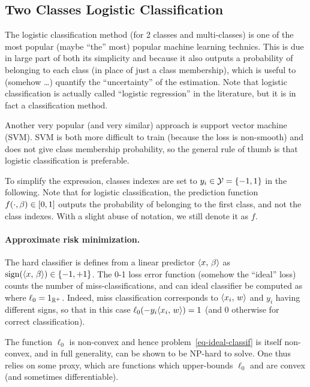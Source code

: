 \subsection{Two Classes Logistic Classification}
\label{sec-two-class-logit}

The logistic classification method (for 2 classes and multi-classes) is one of the most popular (maybe ``the'' most) popular machine learning technics. This is due in large part of both its simplicity and because it also outputs a probability of belonging to each class (in place of just a class membership), which is useful to (somehow \ldots) quantify the ``uncertainty'' of the estimation.
%
Note that logistic classification is actually called ``logistic
regression'' in the literature, but it is in fact a classification method.

Another very popular (and very similar) approach is support vector machine (SVM). SVM is both more difficult to train (because the loss is non-smooth) and does not give class membership probability, so the general rule of thumb is that logistic classification is preferable.

To simplify the expression, classes indexes are set to $y_i \in \mathcal{Y} = \{-1,1\}$ in the following. Note that for logistic classification, the prediction function $f(\cdot,\beta) \in [0,1]$ outputs the probability of belonging to the first class, and not the class indexes. With a slight abuse of notation, we still denote it as $f$. 


\paragraph{Approximate risk minimization.}

The hard classifier is defines from a linear predictor $\langle x,\,\beta\rangle$ as $\operatorname{sign}(\langle x,\,\beta\rangle) \in \{-1,+1\}$. The 0-1 loss error function (somehow the ``ideal'' loss) counts the number of miss-classifications, and can ideal classifier be computed as
where $\ell_0 = 1_{\mathbb{R}^+}$. Indeed, miss classification corresponds to $\langle x_i,\,w\rangle$ and $y_i$ having different signs, so that in this case $\ell_0(-y_i \langle x_i,\,w\rangle)=1$ (and 0 otherwise for correct classification).

The function $\ell_0$ is non-convex and hence problem~\eqref{eq-ideal-classif} is itself non-convex, and in full generality, can be shown to be NP-hard to solve. One thus relies on some proxy, which are functions which upper-bounds $\ell_0$ and are convex (and sometimes differentiable). 

